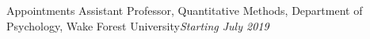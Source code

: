 \begin{rSection}{\textrm{Appointments}}
Assistant Professor, Quantitative Methods, Department of Psychology, Wake Forest University\hfill{\textit{Starting July 2019}}
\end{rSection}